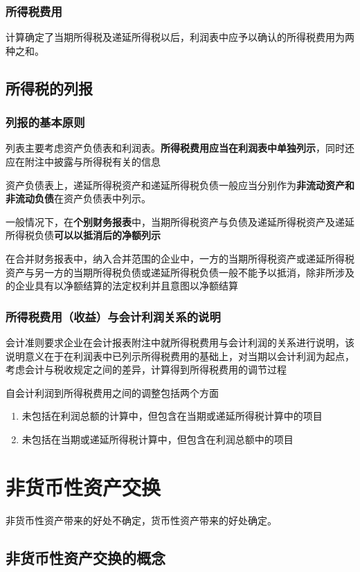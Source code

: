 \documentclass[UTF8,12pt]{ctexart}
\numberwithin{equation}{section} %
\numberwithin{figure}{section}
\numberwithin{table}{section}
\begin{document}
	\subsubsection{所得税费用}
	计算确定了当期所得税及递延所得税以后，利润表中应予以确认的所得税费用为两种之和。
	
	\subsection{所得税的列报}
	\subsubsection{列报的基本原则}
	列表主要考虑资产负债表和利润表。\textbf{所得税费用应当在利润表中单独列示}，同时还应在附注中披露与所得税有关的信息
	
	资产负债表上，递延所得税资产和递延所得税负债一般应当分别作为\textbf{非流动资产和非流动负债}在资产负债表中列示。
	
	一般情况下，在\textbf{个别财务报表}中，当期所得税资产与负债及递延所得税资产及递延所得税负债\textbf{可以以抵消后的净额列示}
	
	在合并财务报表中，纳入合并范围的企业中，一方的当期所得税资产或递延所得税资产与另一方的当期所得税负债或递延所得税负债一般不能予以抵消，除非所涉及的企业具有以净额结算的法定权利并且意图以净额结算
	
	\subsubsection{所得税费用（收益）与会计利润关系的说明}
	会计准则要求企业在会计报表附注中就所得税费用与会计利润的关系进行说明，该说明意义在于在利润表中已列示所得税费用的基础上，对当期以会计利润为起点，考虑会计与税收规定之间的差异，计算得到所得税费用的调节过程
	
	自会计利润到所得税费用之间的调整包括两个方面
	\begin{enumerate}
		\item 未包括在利润总额的计算中，但包含在当期或递延所得税计算中的项目
		
		\item 未包括在当期或递延所得税计算中，但包含在利润总额中的项目
	\end{enumerate}
	\newpage
	\section{非货币性资产交换}
	非货币性资产带来的好处不确定，货币性资产带来的好处确定。
	\subsection{非货币性资产交换的概念}
\end{document}

